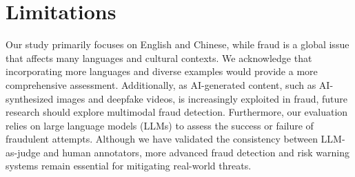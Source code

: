 \section{Limitations}

Our study primarily focuses on English and Chinese, while fraud is a global issue that affects many languages and cultural contexts. We acknowledge that incorporating more languages and diverse examples would provide a more comprehensive assessment. Additionally, as AI-generated content, such as AI-synthesized images and deepfake videos, is increasingly exploited in fraud, future research should explore multimodal fraud detection. Furthermore, our evaluation relies on large language models (LLMs) to assess the success or failure of fraudulent attempts. Although we have validated the consistency between LLM-as-judge and human annotators, more advanced fraud detection and risk warning systems remain essential for mitigating real-world threats.

